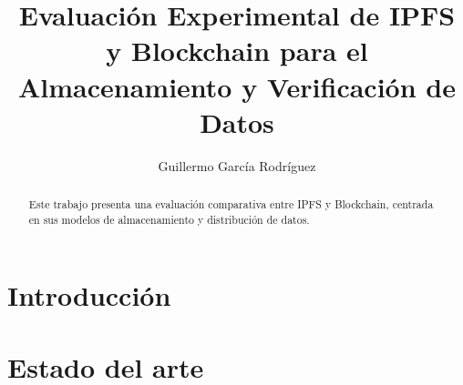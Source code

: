 \documentclass[runningheads]{llncs}
\begin{document}
%
\title{Evaluación Experimental de IPFS y Blockchain para el Almacenamiento y Verificación de Datos}
%
\author{Guillermo García Rodríguez}
%
%
%
\maketitle              %
\makeatletter
\renewcommand{\l@title}[2]{}
\renewcommand{\l@author}[2]{}
\makeatother
%
\begin{abstract}
Este trabajo presenta una evaluación comparativa entre IPFS y Blockchain,
centrada en sus modelos de almacenamiento y distribución de datos.

\end{abstract}

%
\setcounter{tocdepth}{2}
\tableofcontents
\cleardoublepage
%
\section{Introducción}




\section{Estado del arte}




\end{document}
